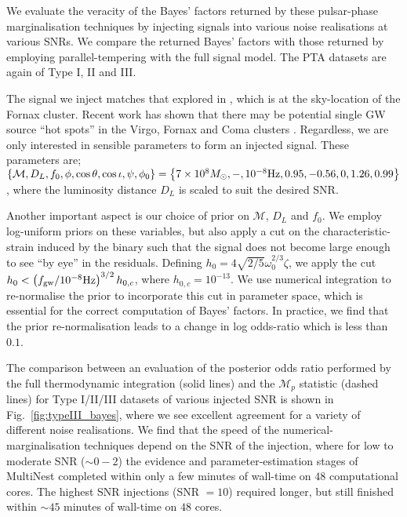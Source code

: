 \documentclass[prd,showpacs,nofootinbib]{revtex4}
\begin{document}
We evaluate the veracity of the Bayes' factors returned by these pulsar-phase marginalisation techniques by injecting signals into various noise realisations at various SNRs. We compare the returned Bayes' factors with those returned by employing parallel-tempering with the full signal model. The PTA datasets are again of Type I, II and III.

The signal we inject matches that explored in \citet{ellis-pipeline}, which is at the sky-location of the Fornax cluster. Recent work has shown that there may be potential single GW source ``hot spots'' in the Virgo, Fornax and Coma clusters \citep{fornax-hotspot}. Regardless, we are only interested in sensible parameters to form an injected signal. These parameters are; $\left\{\mathcal{M},D_L,f_0,\phi,\cos\theta,\cos\iota,\psi,\phi_0\right\} = \left\{7\times10^8M_{\odot},-,10^{-8}{\rm Hz},0.95,-0.56,0,1.26,0.99\right\}$, where the luminosity distance $D_L$ is scaled to suit the desired SNR. 

Another important aspect is our choice of prior on $\mathcal{M}$, $D_L$ and $f_0$. We employ log-uniform priors on these variables, but also apply a cut on the characteristic-strain induced by the binary such that the signal does not become large enough to see ``by eye'' in the residuals. Defining $h_0 = 4\sqrt{2/5}\omega_0^{2/3}\zeta$, we apply the cut $h_0 < \left(f_{\rm gw} / 10^{-8}{\rm Hz}\right)^{3/2}h_{0,c}$, where $h_{0,c}=10^{-13}$. We use numerical integration to re-normalise the prior to incorporate this cut in parameter space, which is essential for the correct computation of Bayes' factors. In practice, we find that the prior re-normalisation leads to a change in log odds-ratio which is less than $0.1$.

The comparison between an evaluation of the posterior odds ratio performed by the full thermodynamic integration (solid lines) and the {\bf $\mathcal{M}_p$} statistic (dashed lines) for Type I/II/III datasets of various injected SNR is shown in Fig.\ \ref{fig:typeIII_bayes}, where we see excellent agreement for a variety of different noise realisations. We find that the speed of the numerical-marginalisation techniques depend on the SNR of the injection, where for low to moderate SNR ($\sim 0 - 2$) the evidence and parameter-estimation stages of MultiNest completed within only a few minutes of wall-time on $48$ computational cores. The highest SNR injections (SNR $=10$) required longer, but still finished within $\sim 45$ minutes of wall-time on $48$ cores. %
\end{document}

